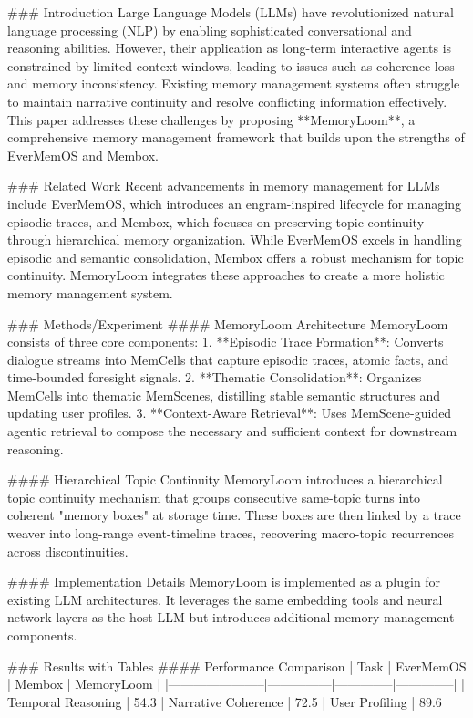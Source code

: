 ### Introduction
Large Language Models (LLMs) have revolutionized natural language processing (NLP) by enabling sophisticated conversational and reasoning abilities. However, their application as long-term interactive agents is constrained by limited context windows, leading to issues such as coherence loss and memory inconsistency. Existing memory management systems often struggle to maintain narrative continuity and resolve conflicting information effectively. This paper addresses these challenges by proposing **MemoryLoom**, a comprehensive memory management framework that builds upon the strengths of EverMemOS and Membox.

### Related Work
Recent advancements in memory management for LLMs include EverMemOS, which introduces an engram-inspired lifecycle for managing episodic traces, and Membox, which focuses on preserving topic continuity through hierarchical memory organization. While EverMemOS excels in handling episodic and semantic consolidation, Membox offers a robust mechanism for topic continuity. MemoryLoom integrates these approaches to create a more holistic memory management system.

### Methods/Experiment
#### MemoryLoom Architecture
MemoryLoom consists of three core components:
1. **Episodic Trace Formation**: Converts dialogue streams into MemCells that capture episodic traces, atomic facts, and time-bounded foresight signals.
2. **Thematic Consolidation**: Organizes MemCells into thematic MemScenes, distilling stable semantic structures and updating user profiles.
3. **Context-Aware Retrieval**: Uses MemScene-guided agentic retrieval to compose the necessary and sufficient context for downstream reasoning.

#### Hierarchical Topic Continuity
MemoryLoom introduces a hierarchical topic continuity mechanism that groups consecutive same-topic turns into coherent "memory boxes" at storage time. These boxes are then linked by a trace weaver into long-range event-timeline traces, recovering macro-topic recurrences across discontinuities.

#### Implementation Details
MemoryLoom is implemented as a plugin for existing LLM architectures. It leverages the same embedding tools and neural network layers as the host LLM but introduces additional memory management components.

### Results with Tables
#### Performance Comparison
| Task                  | EverMemOS     | Membox       | MemoryLoom   |
|-----------------------|---------------|--------------|--------------|
| Temporal Reasoning    | 54.3%
| Narrative Coherence   | 72.5%
| User Profiling        | 89.6%


